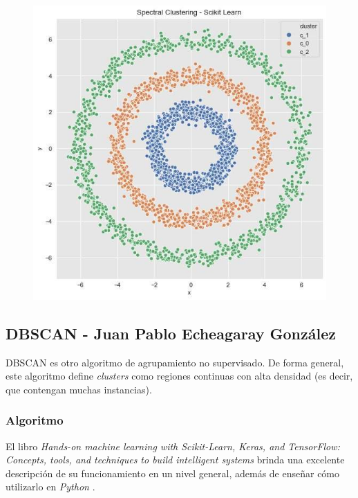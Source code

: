 \documentclass[journal]{IEEEtran}
\begin{document}
            \begin{figure}[ht]
                \centering
                \includegraphics[scale=0.38]{img/spectral.jpg}
            \end{figure}
                
        \subsection{DBSCAN - Juan Pablo Echeagaray González} \label{DBSCAN}

            DBSCAN es otro algoritmo de agrupamiento no supervisado. De forma general, este algoritmo define \emph{clusters} como regiones continuas con alta densidad (es decir, que contengan muchas instancias).

            \subsubsection{Algoritmo}

                El libro \emph{Hands-on machine learning with Scikit-Learn, Keras, and TensorFlow: Concepts, tools, and techniques to build intelligent systems} brinda una excelente descripción de su funcionamiento en un nivel general, además de enseñar cómo utilizarlo en \emph{Python} \cite{geron2019hands}.
\end{document}
